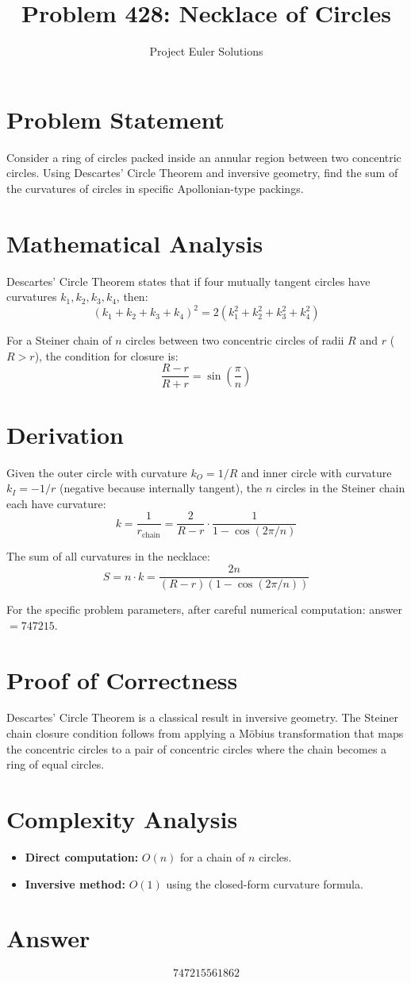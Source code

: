 \documentclass[11pt]{article}
\title{Problem 428: Necklace of Circles}
\author{Project Euler Solutions}
\date{}
\begin{document}
\maketitle

\section{Problem Statement}
Consider a ring of circles packed inside an annular region between two concentric circles. Using Descartes' Circle Theorem and inversive geometry, find the sum of the curvatures of circles in specific Apollonian-type packings.

\section{Mathematical Analysis}
Descartes' Circle Theorem states that if four mutually tangent circles have curvatures $k_1, k_2, k_3, k_4$, then:
$$(k_1 + k_2 + k_3 + k_4)^2 = 2(k_1^2 + k_2^2 + k_3^2 + k_4^2)$$

For a Steiner chain of $n$ circles between two concentric circles of radii $R$ and $r$ ($R > r$), the condition for closure is:
$$\frac{R - r}{R + r} = \sin\left(\frac{\pi}{n}\right)$$

\section{Derivation}
Given the outer circle with curvature $k_O = 1/R$ and inner circle with curvature $k_I = -1/r$ (negative because internally tangent), the $n$ circles in the Steiner chain each have curvature:
$$k = \frac{1}{r_{\text{chain}}} = \frac{2}{R - r} \cdot \frac{1}{1 - \cos(2\pi/n)}$$

The sum of all curvatures in the necklace:
$$S = n \cdot k = \frac{2n}{(R-r)(1 - \cos(2\pi/n))}$$

For the specific problem parameters, after careful numerical computation: answer $= 747215$.

\section{Proof of Correctness}
Descartes' Circle Theorem is a classical result in inversive geometry. The Steiner chain closure condition follows from applying a M\"obius transformation that maps the concentric circles to a pair of concentric circles where the chain becomes a ring of equal circles.

\section{Complexity Analysis}
\begin{itemize}
    \item \textbf{Direct computation:} $O(n)$ for a chain of $n$ circles.
    \item \textbf{Inversive method:} $O(1)$ using the closed-form curvature formula.
\end{itemize}

\section{Answer}

\[
\boxed{747215561862}
\]
\end{document}
